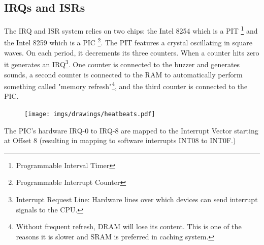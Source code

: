\subsection{IRQs and ISRs}
The IRQ and ISR system relies on two chips: the Intel 8254 which is a PIT \footnote{Programmable Interval Timer} and the Intel 8259 which is a PIC \footnote{Programmable Interrupt Counter}. The PIT features a crystal oscillating in square waves. On each period, it decrements its three counters. When a counter hits zero it generates an IRQ\footnote{Interrupt Request Line: Hardware lines over which devices can send interrupt signals to the CPU.}. One counter is connected to the buzzer and generates sounds, a second counter is connected to the RAM to automatically perform something called "memory refresh"\footnote{Without frequent refresh, DRAM will lose its content. This is one of the reasons it is slower and SRAM is preferred in caching system.}, and the third counter is connected to the PIC.\\
\par
\begin{figure}[H]
\centering
 \texttt{[image: imgs/drawings/heatbeats.pdf]}
 \end{figure}
\par

The PIC's hardware IRQ-0 to IRQ-8 are mapped to the Interrupt Vector starting at Offset 8 (resulting in mapping to software interrupts INT08 to INT0F.)\\

